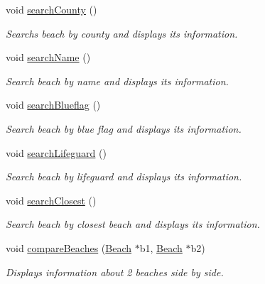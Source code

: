 \begin{DoxyCompactItemize}
\mbox{\label{class_company_a9b7797f2e7b3bc31d1d2c6b7c79d703e}} 
void \hyperlink{class_company_a9b7797f2e7b3bc31d1d2c6b7c79d703e}{search\+County} ()
\begin{DoxyCompactList}\small\item\em Searchs beach by county and displays its information. \end{DoxyCompactList}\item 
\mbox{\label{class_company_a914fcef89a30b4a28cc4455183dab791}} 
void \hyperlink{class_company_a914fcef89a30b4a28cc4455183dab791}{search\+Name} ()
\begin{DoxyCompactList}\small\item\em Search beach by name and displays its information. \end{DoxyCompactList}\item 
\mbox{\label{class_company_a092286ad40ab84da53e3bea296328c78}} 
void \hyperlink{class_company_a092286ad40ab84da53e3bea296328c78}{search\+Blueflag} ()
\begin{DoxyCompactList}\small\item\em Search beach by blue flag and displays its information. \end{DoxyCompactList}\item 
\mbox{\label{class_company_a0b5e263d572328221ade96f872d7ebeb}} 
void \hyperlink{class_company_a0b5e263d572328221ade96f872d7ebeb}{search\+Lifeguard} ()
\begin{DoxyCompactList}\small\item\em Search beach by lifeguard and displays its information. \end{DoxyCompactList}\item 
\mbox{\label{class_company_afd405784090cfc6275fb3e5e6e07142d}} 
void \hyperlink{class_company_afd405784090cfc6275fb3e5e6e07142d}{search\+Closest} ()
\begin{DoxyCompactList}\small\item\em Search beach by closest beach and displays its information. \end{DoxyCompactList}\item 
void \hyperlink{class_company_a7302f90a47eb6d2739270aa411c7a83d}{compare\+Beaches} (\hyperlink{class_beach}{Beach} $\ast$b1, \hyperlink{class_beach}{Beach} $\ast$b2)
\begin{DoxyCompactList}\small\item\em Displays information about 2 beaches side by side. \end{DoxyCompactList}\end{DoxyCompactItemize}


